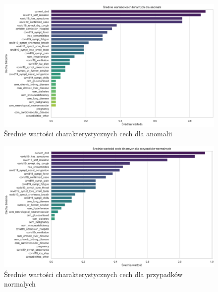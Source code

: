 \documentclass[a4paper,fleqn]{cas-dc}
\begin{document}
\begin{figure}[h]
	\includegraphics[scale=.35]{wykresy/wykres4.png}
	\caption{Średnie wartości charakterystycznych cech dla anomalii}
	\label{FIG:1}
\end{figure}

\begin{figure}[h]
	\includegraphics[scale=.35]{wykresy/wykres5.png}
	\caption{Średnie wartości charakterystycznych cech dla przypadków normalych}
	\label{FIG:1}
\end{figure}
\end{document}
